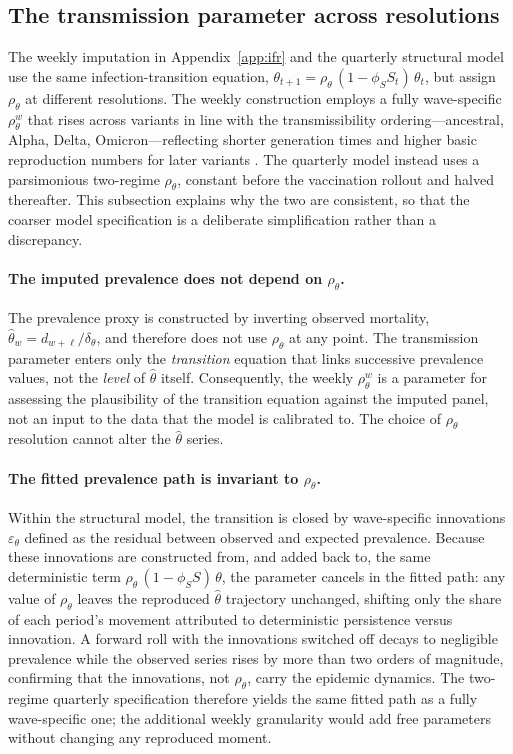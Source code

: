\documentclass[12pt, a4paper]{article}
\begin{document}
\subsection{The transmission parameter across resolutions}
\label{app:rho}

The weekly imputation in Appendix~\ref{app:ifr} and the quarterly structural
model use the same infection-transition equation,
$\theta_{t+1} = \rho_\theta\,(1 - \phi_S S_t)\,\theta_t$, but assign
$\rho_\theta$ at different resolutions. The weekly construction employs a
fully wave-specific $\rho_\theta^w$ that rises across variants in line with
the transmissibility ordering---ancestral, Alpha, Delta, Omicron---reflecting
shorter generation times and higher basic reproduction numbers for later
variants \citep{hart2022,manica2022,madewell2023}. The quarterly model instead
uses a parsimonious two-regime $\rho_\theta$, constant before the vaccination
rollout and halved thereafter. This subsection explains why the two are
consistent, so that the coarser model specification is a deliberate
simplification rather than a discrepancy.

\paragraph{The imputed prevalence does not depend on $\rho_\theta$.}
The prevalence proxy is constructed by inverting observed mortality,
$\hat{\theta}_w = d_{w+\ell}/\delta_\theta$, and therefore does not use
$\rho_\theta$ at any point. The transmission parameter enters only the
\emph{transition} equation that links successive prevalence values, not the
\emph{level} of $\hat{\theta}$ itself. Consequently, the weekly $\rho_\theta^w$
is a parameter for assessing the plausibility of the transition equation
against the imputed panel, not an input to the data that the model is
calibrated to. The choice of $\rho_\theta$ resolution cannot alter the
$\hat{\theta}$ series.

\paragraph{The fitted prevalence path is invariant to $\rho_\theta$.}
Within the structural model, the transition is closed by wave-specific
innovations $\varepsilon_\theta$ defined as the residual between observed and
expected prevalence. Because these innovations are constructed from, and added
back to, the same deterministic term $\rho_\theta\,(1-\phi_S S)\,\theta$, the
parameter cancels in the fitted path: any value of $\rho_\theta$ leaves the
reproduced $\hat{\theta}$ trajectory unchanged, shifting only the share of
each period's movement attributed to deterministic persistence versus
innovation. A forward roll with the innovations switched off decays to
negligible prevalence while the observed series rises by more than two orders
of magnitude, confirming that the innovations, not $\rho_\theta$, carry the
epidemic dynamics. The two-regime quarterly specification therefore yields the
same fitted path as a fully wave-specific one; the additional weekly
granularity would add free parameters without changing any reproduced moment.
\end{document}
